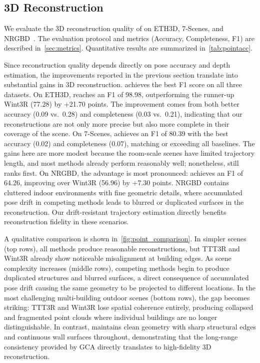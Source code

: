 

\subsection{3D Reconstruction}

We evaluate the 3D reconstruction quality of \method on ETH3D,
7-Scenes, and NRGBD~\cite{azinovic2022neural}.
The evaluation protocol and metrics (Accuracy, Completeness, F1)
are described in~\cref{sec:metrics}.
Quantitative results are summarized in~\cref{tab:pointacc}.

Since reconstruction quality depends directly on pose accuracy
and depth estimation, the improvements reported in the previous
section translate into substantial gains in 3D reconstruction.
\method achieves the best F1 score on all three datasets.
On ETH3D, \method reaches an F1 of 98.98, outperforming the
runner-up Wint3R (77.28) by +21.70 points.
The improvement comes from both better accuracy (0.09 vs.\ 0.28)
and completeness (0.03 vs.\ 0.21), indicating that our
reconstructions are not only more precise but also more complete
in their coverage of the scene.
On 7-Scenes, \method achieves an F1 of 80.39 with the best
accuracy (0.02) and completeness (0.07), matching or exceeding
all baselines.
The gains here are more modest because the room-scale scenes
have limited trajectory length, and most methods already perform
reasonably well; nonetheless, \method still ranks first.
On NRGBD, the advantage is most pronounced: \method achieves an
F1 of 64.26, improving over Wint3R (56.96) by +7.30 points.
NRGBD contains cluttered indoor environments with fine geometric
details, where accumulated pose drift in competing methods leads
to blurred or duplicated surfaces in the reconstruction.
Our drift-resistant trajectory estimation directly benefits
reconstruction fidelity in these scenarios.

A qualitative comparison is shown in~\cref{fig:point_comparison}.
In simpler scenes (top rows), all methods produce reasonable
reconstructions, but TTT3R and Wint3R already show noticeable
misalignment at building edges.
As scene complexity increases (middle rows), competing methods begin
to produce duplicated structures and blurred surfaces, a direct
consequence of accumulated pose drift causing the same geometry to
be projected to different locations.
In the most challenging multi-building outdoor scenes (bottom rows),
the gap becomes striking: TTT3R and Wint3R lose spatial coherence
entirely, producing collapsed and fragmented point clouds where
individual buildings are no longer distinguishable.
In contrast, \method maintains clean geometry with sharp structural
edges and continuous wall surfaces throughout, demonstrating that
the long-range consistency provided by GCA directly translates to
high-fidelity 3D reconstruction.




